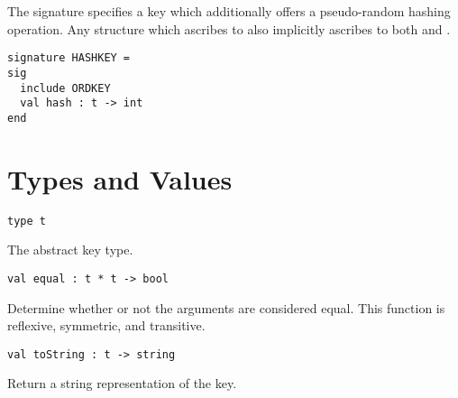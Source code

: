 \begin{cluster}
\label{grp:grm:key-interface::hashkey}

\begin{gram}
\label{grm:key-interface::hashkey}
The  signature specifies a key which additionally offers a
pseudo-random hashing operation. Any structure which ascribes to 
also implicitly ascribes to both  and .
\begin{verbatim}
signature HASHKEY =
sig
  include ORDKEY
  val hash : t -> int
end
\end{verbatim}

\end{gram}
\end{cluster}


\section{Types and Values}
\label{sec:key-interface::types-and-values}

\begin{cluster}
\label{grp:grm:key-interface::type}

\begin{gram}
\label{grm:key-interface::type}
\begin{verbatim}
type t
\end{verbatim}
The abstract key type.

\end{gram}
\end{cluster}

\begin{cluster}
\label{grp:grm:key-interface::equal}

\begin{gram}[equal]
\label{grm:key-interface::equal}
\begin{verbatim}
val equal : t * t -> bool
\end{verbatim}
Determine whether or not the arguments are considered equal. This function is
reflexive, symmetric, and transitive.

\end{gram}
\end{cluster}

\begin{cluster}
\label{grp:grm:key-interface::tostring}

\begin{gram}[toString]
\label{grm:key-interface::tostring}
\begin{verbatim}
val toString : t -> string
\end{verbatim}
Return a string representation of the key.

\end{gram}
\end{cluster}

